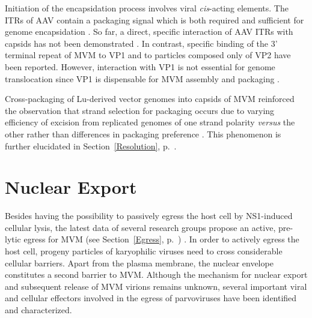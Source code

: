 Initiation of the encapsidation process involves viral \textit{cis}-acting elements. The ITRs of AAV contain a packaging signal which is both required and sufficient for genome encapsidation \cite{pmid2547998}. So far, a direct, specific interaction of AAV ITRs with capsids has not been demonstrated \cite{pmid8627687, pmid9060669}. In contrast, specific binding of the 3' terminal repeat of MVM to VP1 \cite{pmid1870193} and to particles composed only of VP2 \cite{pmid8350419} have been reported. However, interaction with VP1 is not essential for genome translocation since VP1 is dispensable for MVM assembly and packaging \cite{pmid8416366}.      

Cross-packaging of Lu-derived vector genomes into capsids of MVM reinforced the observation that strand selection for packaging occurs due to varying efficiency of excision from replicated genomes of one strand polarity \textit{versus} the other rather than differences in packaging preference \cite{pmid15866075}. This phenomenon is further elucidated in Section~\ref{Resolution}, p.~\pageref{Resolution}.   
\label{Packaging1} 

\section{Nuclear Export}
\label{Export}
Besides having the possibility to passively egress the host cell by NS1-induced cellular lysis, the latest data of several research groups propose an active, pre-lytic egress for MVM (see Section~\ref{Egress}, p.~\pageref{Egress}) \cite{pmid24068925, pmid18704167, pmid15367635}. In order to actively egress the host cell, progeny particles of karyophilic viruses need to cross considerable cellular barriers. Apart from the plasma membrane, the nuclear envelope constitutes a second barrier to MVM. Although the mechanism for nuclear export and subsequent release of MVM virions remains unknown, several important viral and cellular effectors involved in the egress of parvoviruses have been identified and characterized. 

